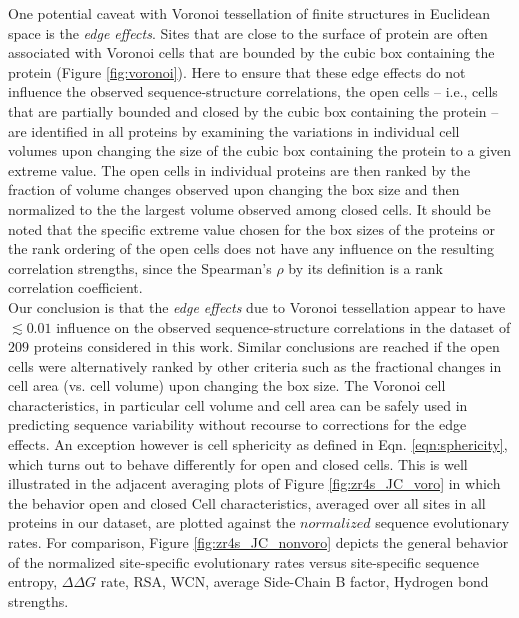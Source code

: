\documentclass[11pt]{article}
\begin{document}
\begin{appendices}
    One potential caveat with Voronoi tessellation of finite structures in Euclidean space is the {\it edge effects}. Sites that are close to the surface of protein are often associated with Voronoi cells that are bounded by the cubic box containing the protein (Figure \ref{fig:voronoi}). Here to ensure that these edge effects do not influence the observed sequence-structure correlations, the open cells -- i.e., cells that are partially bounded and closed by the cubic box containing the protein -- are identified in all proteins by examining the variations in individual cell volumes upon changing the size of the cubic box containing the protein to a given extreme value. The open cells in individual proteins are then ranked by the fraction of volume changes observed upon changing the box size and then normalized to the the largest volume observed among closed cells. It should be noted that the specific extreme value chosen for the box sizes of the proteins or the rank ordering of the open cells does not have any influence on the resulting correlation strengths, since the Spearman's $\rho$ by its definition is a rank correlation coefficient. \\

    Our conclusion is that the {\it edge effects} due to Voronoi tessellation appear to have $\lesssim0.01$ influence on the observed sequence-structure correlations in the dataset of $209$ proteins considered in this work. Similar conclusions are reached if the open cells were alternatively ranked by other criteria such as the fractional changes in cell area (vs. cell volume) upon changing the box size. The Voronoi cell characteristics, in particular cell volume and cell area can be safely used in predicting sequence variability without recourse to corrections for the edge effects. An exception however is cell sphericity as defined in Eqn. \ref{eqn:sphericity}, which turns out to behave differently for open and closed cells. This is well illustrated in the adjacent averaging plots of Figure \ref{fig:zr4s_JC_voro} in which the behavior open and closed Cell characteristics, averaged over all sites in all proteins in our dataset, are plotted against the $normalized$ sequence evolutionary rates. For comparison, Figure \ref{fig:zr4s_JC_nonvoro} depicts the general behavior of the normalized site-specific evolutionary rates versus site-specific sequence entropy, $\Delta\Delta G$ rate, RSA, WCN, average Side-Chain B factor, Hydrogen bond strengths.



\end{appendices}
\end{document}
